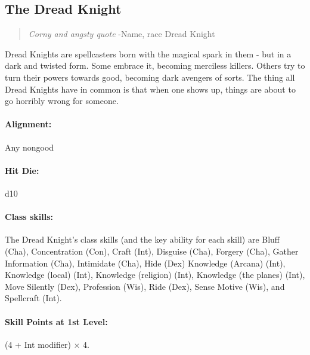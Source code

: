 \subsection[Dread Knight]{The Dread Knight}
\begin{quote}
\emph{Corny and angsty quote}
-Name, race Dread Knight
\end{quote}

Dread Knights are spellcasters born with the magical spark in them - but in a dark and twisted form. Some embrace it, becoming merciless killers.
Others try to turn their powers towards good, becoming dark avengers of sorts.
The thing all Dread Knights have in common is that when one shows up, things are about to go horribly wrong for someone.
\paragraph{Alignment:} Any nongood
\paragraph{Hit Die:} d10
\paragraph{Class skills:}
The Dread Knight's class skills (and the key ability for each skill) are Bluff (Cha), Concentration (Con), Craft (Int), Disguise (Cha), Forgery (Cha), Gather Information (Cha), Intimidate (Cha), Hide (Dex) Knowledge (Arcana) (Int), Knowledge (local) (Int), Knowledge (religion) (Int), Knowledge (the planes) (Int), Move Silently (Dex), Profession (Wis), Ride (Dex), Sense Motive (Wis), and Spellcraft (Int).

\paragraph{Skill Points at 1st Level:} (4 + Int modifier) $\times$ 4.
